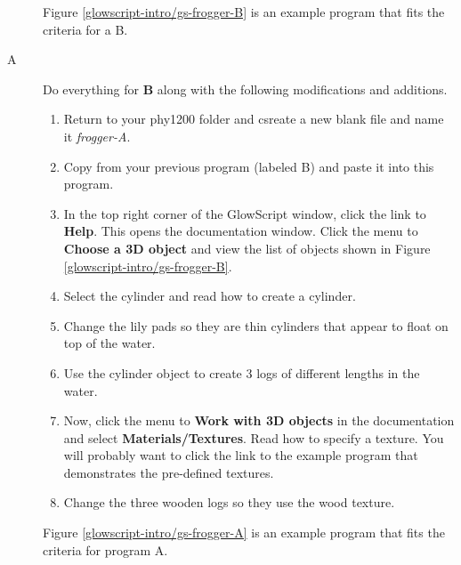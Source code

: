 \begin{description}
Figure \ref{glowscript-intro/gs-frogger-B} is an example program that fits the criteria for a B.



\item[A] Do everything for {\bf B} along with the following modifications and additions.

\begin{enumerate}
	\item Return to your phy1200 folder and csreate a new blank file and name it \emph{frogger-A}. 
	\item Copy from your previous program (labeled B) and paste it into this program.
	\item In the top right corner of the GlowScript window, click the link to {\bf Help}. This opens the documentation window. Click the menu to {\bf Choose a 3D object} and view the list of objects shown in Figure \ref{glowscript-intro/gs-frogger-B}.


	\item Select the cylinder and read how to create a cylinder.
	
	\item Change the lily pads so they are thin cylinders that appear to float on top of the water.
	
	\item Use the cylinder object to create 3 logs of different lengths in the water.
	
	\item Now, click the menu to {\bf Work with 3D objects} in the documentation and select {\bf Materials/Textures}. Read how to specify a texture. You will probably want to click the link to the example program that demonstrates the pre-defined textures.
	
	\item Change the three wooden logs so they use the wood texture.

\end{enumerate}

Figure \ref{glowscript-intro/gs-frogger-A} is an example program that fits the criteria for program A.





\end{description}

